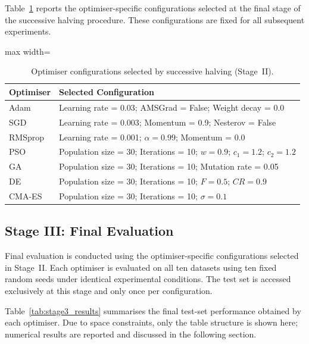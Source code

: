 \documentclass[a4paper,12pt,oneside]{article}
\begin{document}
Table~\ref{tab:sh_selected} reports the optimiser-specific configurations
selected at the final stage of the successive halving procedure.
These configurations are fixed for all subsequent experiments.

\begin{table}[t]
\centering
\caption{Optimiser configurations selected by successive halving (Stage~II).}
\label{tab:sh_selected}
\begin{adjustbox}{max width=\linewidth}
\begin{tabular}{ll}
\toprule
\textbf{Optimiser} & \textbf{Selected Configuration} \\
\midrule
Adam &
Learning rate = 0.03; AMSGrad = False; Weight decay = 0.0 \\

SGD &
Learning rate = 0.003; Momentum = 0.9; Nesterov = False \\

RMSprop &
Learning rate = 0.001; $\alpha = 0.99$; Momentum = 0.0 \\

PSO &
Population size = 30; Iterations = 10;
$w = 0.9$; $c_1 = 1.2$; $c_2 = 1.2$ \\

GA &
Population size = 30; Iterations = 10;
Mutation rate = 0.05 \\

DE &
Population size = 30; Iterations = 10;
$F = 0.5$; $CR = 0.9$ \\

CMA-ES &
Population size = 30; Iterations = 10;
$\sigma = 0.1$ \\
\bottomrule
\end{tabular}
\end{adjustbox}
\end{table}

\subsection{Stage III: Final Evaluation}

Final evaluation is conducted using the optimiser-specific configurations
selected in Stage~II.
Each optimiser is evaluated on all ten datasets using ten fixed random seeds
under identical experimental conditions.
The test set is accessed exclusively at this stage and only once per
configuration.

Table~\ref{tab:stage3_results} summarises the final test-set performance obtained
by each optimiser.
Due to space constraints, only the table structure is shown here; numerical
results are reported and discussed in the following section.
\end{document}
